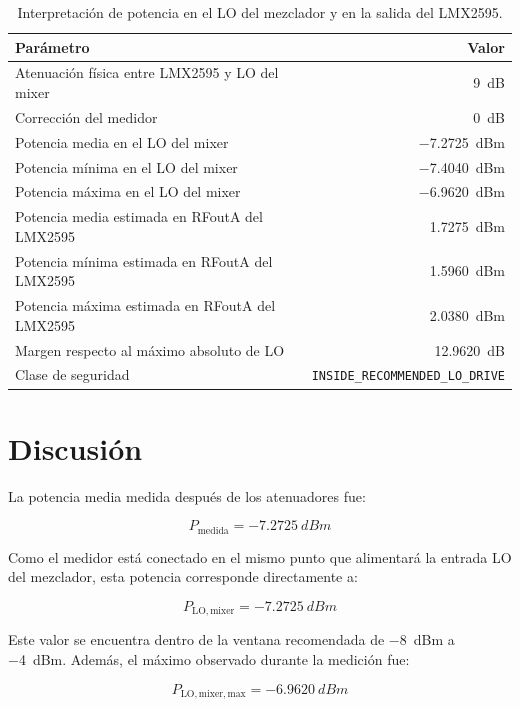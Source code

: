 \documentclass[12pt,a4paper]{article}
\begin{document}
\begin{table}[H]
\centering
\caption{Interpretación de potencia en el LO del mezclador y en la salida del LMX2595.}
\label{tab:lo_results}
\begin{tabular}{lr}
\toprule
\textbf{Parámetro} & \textbf{Valor} \\
\midrule
Atenuación física entre LMX2595 y LO del mixer & \SI{9}{dB} \\
Corrección del medidor & \SI{0}{dB} \\
Potencia media en el LO del mixer & \SI{-7.2725}{dBm} \\
Potencia mínima en el LO del mixer & \SI{-7.4040}{dBm} \\
Potencia máxima en el LO del mixer & \SI{-6.9620}{dBm} \\
Potencia media estimada en RFoutA del LMX2595 & \SI{1.7275}{dBm} \\
Potencia mínima estimada en RFoutA del LMX2595 & \SI{1.5960}{dBm} \\
Potencia máxima estimada en RFoutA del LMX2595 & \SI{2.0380}{dBm} \\
Margen respecto al máximo absoluto de LO & \SI{12.9620}{dB} \\
Clase de seguridad & \texttt{INSIDE\_RECOMMENDED\_LO\_DRIVE} \\
\bottomrule
\end{tabular}
\end{table}

\section{Discusión}

La potencia media medida después de los atenuadores fue:

\begin{equation}
P_{\mathrm{medida}} = \SI{-7.2725}{dBm}
\end{equation}

Como el medidor está conectado en el mismo punto que alimentará la entrada LO del mezclador, esta potencia corresponde directamente a:

\begin{equation}
P_{\mathrm{LO,mixer}} = \SI{-7.2725}{dBm}
\end{equation}

Este valor se encuentra dentro de la ventana recomendada de \SI{-8}{dBm} a \SI{-4}{dBm}. Además, el máximo observado durante la medición fue:

\begin{equation}
P_{\mathrm{LO,mixer,max}} = \SI{-6.9620}{dBm}
\end{equation}
\end{document}
